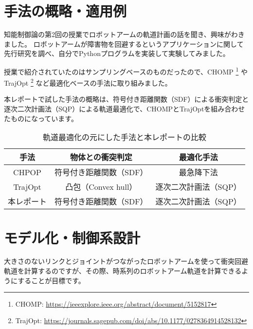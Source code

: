 
\section{手法の概略・適用例}

知能制御論の第2回の授業でロボットアームの軌道計画の話を聞き、興味がわきました。
ロボットアームが障害物を回避するというアプリケーションに関して先行研究を調べ、自分でPythonプログラムを実装して実験してみました。

授業で紹介されていたのはサンプリングベースのものだったので、CHOMP
\footnote{CHOMP: \url{https://ieeexplore.ieee.org/abstract/document/5152817}}
やTrajOpt
\footnote{TrajOpt: \url{https://journals.sagepub.com/doi/abs/10.1177/0278364914528132}}
など最適化ベースの手法に取り組みました。

本レポートで試した手法の概略は、符号付き距離関数（SDF）による衝突判定と逐次二次計画法（SQP）による軌道最適化で、CHOMPとTrajOptを組み合わせたものになっています。

\begin{table}[htbp]
  \centering
  \begin{tabular}{c||c|c}
    手法 & 物体との衝突判定 & 最適化手法                         \\ \hline
    CHPOP      & 符号付き距離関数（SDF） & 最急降下法            \\
    TrajOpt    & 凸包（Convex hull）     & 逐次二次計画法（SQP） \\
    本レポート & 符号付き距離関数（SDF） & 逐次二次計画法（SQP） \\
  \end{tabular}
  \caption{軌道最適化の元にした手法と本レポートの比較}
  \label{table:compare}
\end{table}

\section{モデル化・制御系設計}
大きさのないリンクとジョイントがつながったロボットアームを使って衝突回避軌道を計算するのですが、その際、時系列のロボットアーム軌道を計算できるようにすることが目標です。

